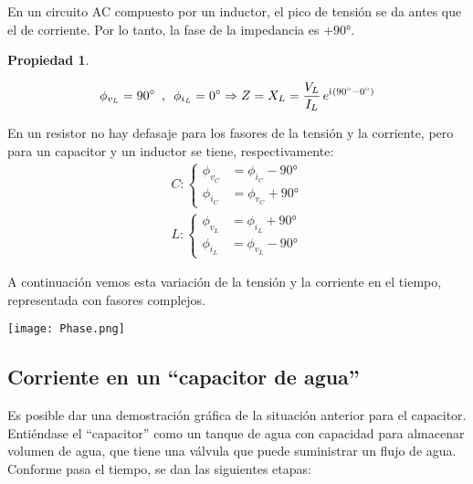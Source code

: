\documentclass[a5paper,12pt,twoside]{book}
\newtheorem{prop}{{Propiedad}}[chapter]
\begin{document}
En un circuito AC compuesto por un inductor, el pico de tensión se da antes que el de corriente. Por lo tanto, la fase de la impedancia es $+\ang{90}$.

\begin{mdframed}[style=MyFrame1]
    \begin{prop}
    \end{prop}
    \begin{equation*}
        \phi_{v_L} = \ang{90} \enspace , \enspace \phi_{i_L} = \ang{0} \Rightarrow Z = X_L = \frac{V_L}{I_L} \, e^{\mathrm{i}\mkern1mu \left(\ang{90} - \ang{0}\right)}
    \end{equation*}
\end{mdframed}

En un resistor no hay defasaje para los fasores de la tensión y la corriente, pero para un capacitor y un inductor se tiene, respectivamente:
\begin{gather*}
    C: \left\{
    \begin{aligned}
        \phi_{v_C} &= \phi_{i_C} - \ang{90}
        \\
        \phi_{i_C} &= \phi_{v_C} + \ang{90}
    \end{aligned}
    \right.
    \\[1em]
    L: \left\{
    \begin{aligned}
        \phi_{v_L} &= \phi_{i_L} + \ang{90}
        \\
        \phi_{i_L} &= \phi_{v_L} - \ang{90}
    \end{aligned}
    \right.
\end{gather*}

A continuación vemos esta variación de la tensión y la corriente en el tiempo, representada con fasores complejos.

\begin{center}
    \texttt{[image: Phase.png]}
\end{center}


\subsection*{Corriente en un ``capacitor de agua''}

Es posible dar una demostración gráfica de la situación anterior para el capacitor. Entiéndase el ``capacitor'' como un tanque de agua con capacidad para almacenar volumen de agua, que tiene una válvula que puede suministrar un flujo de agua. Conforme pasa el tiempo, se dan las siguientes etapas:
\end{document}
